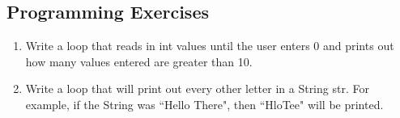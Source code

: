 \subsection{Programming Exercises}

\setcounter{counter}{1}
\begin{enumerate}[label={\arabic{counter}\addtocounter{counter}{1}}.]

\item Write a loop that reads in int values until the user enters 0 and prints out how many values entered are greater than 10.

\item Write a loop that will print out every other letter in a String str. For example, if the String was ``Hello There", then ``HloTee" will be printed.

\end{enumerate}